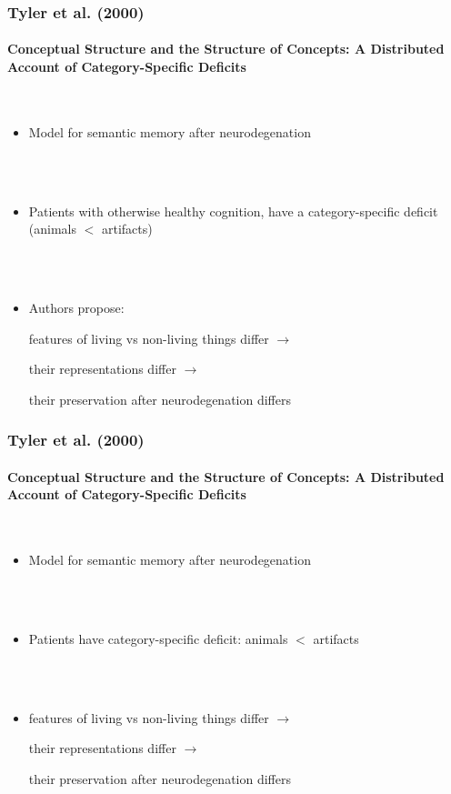 \documentclass{beamer}
\begin{document}
\begin{frame}[fragile]
\frametitle{Tyler et al. (2000)}
\framesubtitle{Conceptual Structure and the Structure of Concepts: A
Distributed Account of Category-Specific Deficits}
        \  \\

\begin{itemize}
\item<2-> Model for semantic memory after neurodegenation 

\ \\

\ \\

 \item <3-> Patients with otherwise healthy cognition, have a category-specific deficit (animals $<$ artifacts) 
 
\ \\

 \ \\
 
\item<4-> Authors propose:

features of living vs non-living things differ $\rightarrow$

their representations differ $\rightarrow$

their preservation after neurodegenation differs

 

\end{itemize}


\end{frame}


\begin{frame}[fragile]
\frametitle{Tyler et al. (2000)}
\framesubtitle{Conceptual Structure and the Structure of Concepts: A
Distributed Account of Category-Specific Deficits}
             \  \\

\begin{itemize}
\item<2-> Model for semantic memory after neurodegenation 

\ \\

\ \\

 \item <3-> Patients have category-specific deficit: animals $<$ artifacts

 \ \\
 
 \ \\
 
\item<4->features of living vs non-living things differ $\rightarrow$

their representations differ $\rightarrow$

their preservation after neurodegenation differs
\end{itemize}
\end{frame}
\end{document}
